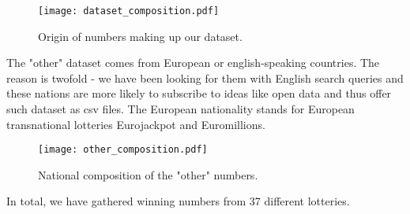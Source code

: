 \begin{figure}
    \centering
    \texttt{[image: dataset\_composition.pdf]}
    \caption{Origin of numbers making up our dataset.}
    \label{fig:dataset}
\end{figure}

The "other" dataset comes from European or english-speaking countries. The reason is twofold - we have been looking
for them with English search queries and these nations are more likely to subscribe to ideas like open data and thus
offer such dataset as csv files. The European nationality stands for European transnational lotteries Eurojackpot and Euromillions.

\begin{figure}
    \centering
    \texttt{[image: other\_composition.pdf]}
    \caption{National composition of the "other" numbers.}
\end{figure}

In total, we have gathered winning numbers from 37 different lotteries.
